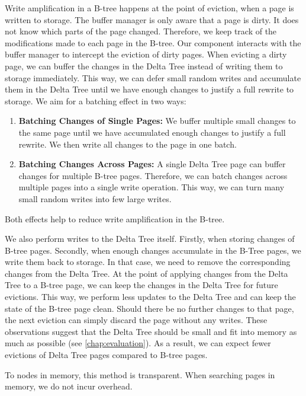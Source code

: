Write amplification in a B-tree happens at the point of eviction, when a page is written to storage.
The buffer manager is only aware that a page is dirty.
It does not know which parts of the page changed.
Therefore, we keep track of the modifications made to each page in the B-tree.
Our component interacts with the buffer manager to intercept the eviction of dirty pages.
When evicting a dirty page, we can buffer the changes in the Delta Tree instead of writing them to storage immediately.
This way, we can defer small random writes and accumulate them in the Delta Tree until we have enough changes to justify a full rewrite to storage.
We aim for a batching effect in two ways:
\begin{enumerate}
  \item
  \textbf{Batching Changes of Single Pages:} 
  We buffer multiple small changes to the same page until we have accumulated enough changes to justify a full rewrite. 
  We then write all changes to the page in one batch.
  \item
  \textbf{Batching Changes Across Pages:}
  A single Delta Tree page can buffer changes for multiple B-tree pages.
  Therefore, we can batch changes across multiple pages into a single write operation.
  This way, we can turn many small random writes into few large writes.
\end{enumerate}
Both effects help to reduce write amplification in the B-tree.

We also perform writes to the Delta Tree itself.
Firstly, when storing changes of B-tree pages.
Secondly, when enough changes accumulate in the B-Tree pages, we write them back to storage.
In that case, we need to remove the corresponding changes from the Delta Tree.
At the point of applying changes from the Delta Tree to a B-tree page, we can keep the changes in the Delta Tree for future evictions.
This way, we perform less updates to the Delta Tree and can keep the state of the B-tree page clean.
Should there be no further changes to that page, the next eviction can simply discard the page without any writes.
These observations suggest that the Delta Tree should be small and fit into memory as much as possible (see \autoref{chap:evaluation}).
As a result, we can expect fewer evictions of Delta Tree pages compared to B-tree pages.

To nodes in memory, this method is transparent.
When searching pages in memory, we do not incur overhead.


